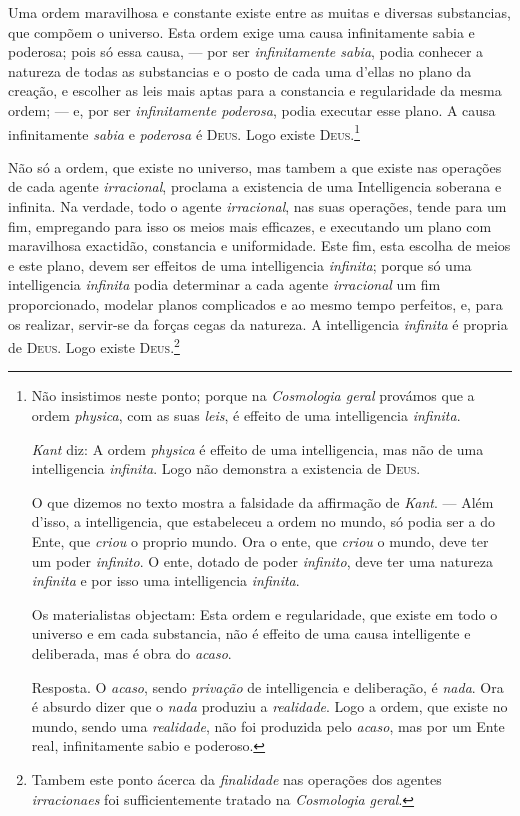  Uma ordem maravilhosa e constante existe entre as muitas e diversas
substancias, que compõem o universo. Esta ordem exige uma causa infinitamente sabia e
poderosa; pois só essa causa, --- por ser \emph{infinitamente sabia}, podia conhecer a
natureza de todas as substancias e o posto de cada uma d'ellas no plano da creação, e
escolher as leis mais aptas para a constancia e regularidade da mesma ordem; --- e, por
ser \emph{infinitamente poderosa}, podia executar esse plano. A causa infinitamente
\emph{sabia} e \emph{poderosa} é \textsc{Deus}. Logo existe
\textsc{Deus}.\footnote{Não insistimos neste ponto; porque na \emph{Cosmologia geral} provámos que a ordem
\emph{physica}, com as suas \emph{leis}, é effeito de uma intelligencia \emph{infinita}.

\emph{Kant} diz: A ordem \emph{physica} é effeito de uma intelligencia, mas não de uma
intelligencia \emph{infinita}. Logo não demonstra a existencia de \textsc{Deus}.

O que dizemos no texto mostra a falsidade da affirmação de \emph{Kant}. --- Além d'isso,
a intelligencia, que estabeleceu a ordem no mundo, só podia
ser a do Ente, que \emph{criou} o proprio mundo. Ora o ente, que \emph{criou} o mundo,
deve ter um poder \emph{infinito}. O ente, dotado de poder \emph{infinito}, deve ter uma
natureza \emph{infinita} e por isso uma intelligencia \emph{infinita}.

Os materialistas objectam: Esta ordem e regularidade, que existe em todo o universo e em
cada substancia, não é effeito de uma causa intelligente e deliberada, mas é obra do
\emph{acaso}.

Resposta. O \emph{acaso}, sendo \emph{privação} de intelligencia e deliberação, é
\emph{nada}. Ora é absurdo dizer que o \emph{nada} produziu a \emph{realidade}. Logo a
ordem, que existe no mundo, sendo uma \emph{realidade}, não foi produzida pelo
\emph{acaso}, mas por um Ente real, infinitamente sabio e poderoso.}

 Não só a ordem, que existe no universo, mas tambem a que existe nas operações
de cada agente \emph{irracional}, proclama
 a existencia de uma Intelligencia soberana e infinita. Na verdade, todo o agente
\emph{irracional}, nas suas operações, tende para um fim, empregando para isso os meios
mais efficazes, e executando um plano com maravilhosa exactidão, constancia e
uniformidade. Este fim, esta escolha de meios e este plano, devem ser effeitos de uma
intelligencia \emph{infinita}; porque só uma intelligencia \emph{infinita} podia
determinar a cada agente \emph{irracional} um fim proporcionado, modelar planos
complicados e ao mesmo tempo perfeitos, e, para os realizar, servir-se da forças cegas
da natureza. A intelligencia \emph{infinita} é propria de \textsc{Deus}. Logo existe
\textsc{Deus}.\footnote{Tambem este ponto ácerca da \emph{finalidade} nas operações dos
agentes \emph{irracionaes} foi sufficientemente tratado na \emph{Cosmologia geral}.}

